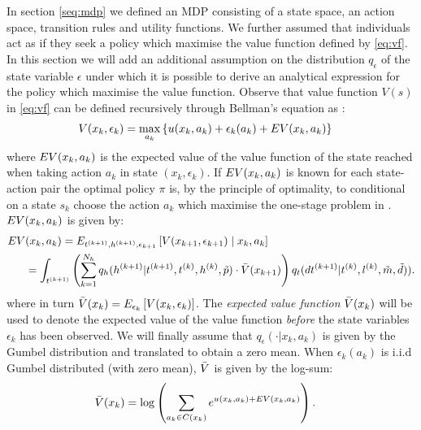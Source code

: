 In section \ref{seq:mdp} we defined an MDP consisting of a state space, an action space, transition rules and utility functions. We further assumed that individuals act as if they seek a policy which maximise the value function defined by \eqref{eq:vf}. In this section we will add an additional assumption on the distribution $q_\epsilon$ of the state variable $\epsilon$ under which it is possible to derive an analytical expression for the policy which maximise the value function. Observe that value function $V(s)$ in \eqref{eq:vf} can be defined recursively through Bellman's equation as \citep{bellman,Rust87}:
\begin{equation} \label{eq:vfbellman}
\begin{aligned}
V(x_k,\epsilon_k) &= \max_{a_k} \left\{\avgu(x_k,a_k) + \epsilon_k(a_k)+ \eutil(x_k,a_k) \right\} 
\end{aligned}
\end{equation}
where $EV(x_k,a_k) $ is the expected value of the value function of the state reached when taking action $a_k$ in state $(x_k,\epsilon_k)$. If $EV(x_k,a_k)$ is known for each state-action pair the optimal policy $\pi$ is, by the principle of optimality, to conditional on a state $s_k$ choose the action $a_k$ which maximise the one-stage problem in . $EV(x_k,a_k) $ is given by: 
\begin{equation} \label{eq:eutil}
\begin{aligned}
	\eutil&(x_k,a_k)  = E_{t\ks{k+1},\amem\ks{k+1},\epsilon_{k+1}}\left[ V(x_{k+1},\epsilon_{k+1}) \mid x_k,a_k \right] \\
	&= \int_{t\ks{k+1}} \left( \sum_{k=1}^{N_{\amem}}q_\amem(\amem\ks{k+1}|t\ks{k+1}, t\ks{k},\amem\ks{k},\act{p}) \cdot \ev(x_{k+1}) \right)q_t(dt\ks{k+1}|t\ks{k},l\ks{k},\act{m},\act{d})).
	\end{aligned}
\end{equation}
where in turn $\bar{V}(x_k) = E_{\epsilon_k} \left[ V(x_k,\epsilon_k) \right]$.
The \emph{expected value function} $\bar{V}(x_k)$ will be used to denote the expected value of the value function \emph{before} the state variables $\epsilon_k$ has been observed.  We will finally assume that $q_\epsilon(\cdot|x_k,a_k)$ is given by the Gumbel distribution and translated to obtain a zero mean. When $\epsilon_k(a_k)$ is i.i.d Gumbel distributed (with zero mean), $\bar{V}$ is given by the log-sum:
\begin{equation} \label{eq:evfbellman}
\begin{aligned}
\ev(x_k) &= %
\log\left(\sum_{a_k\in C(x_{k})} e^{\avgu(x_k,a_k) + \eutil(x_k,a_k)}\right).
\end{aligned}
\end{equation}
